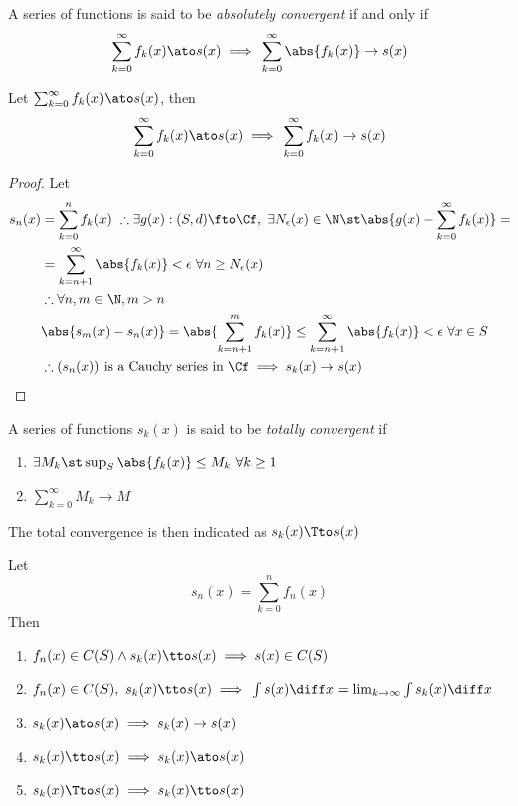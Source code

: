 \documentclass[../mmf.tex]{subfiles}
\begin{document}
\begin{dfn}
	A series of functions is said to be \textit{absolutely convergent} if and only if
	\begin{equation}
		\sum_{k=0}^\infty f_k(x)\ato s(x)\implies{}\sum_{k=0}^\infty\abs{f_k(x)}\to s(x)
		\label{eq:absoluteconvser}
	\end{equation}
\end{dfn}
\begin{thm}
	Let $\sum_{k=0}^\infty f_k(x)\ato s(x)$, then
	\begin{equation}
		\sum_{k=0}^\infty f_k(x)\ato s(x)\implies{}\sum_{k=0}^\infty f_k(x)\to s(x)
		\label{eq:abstounif}
	\end{equation}
\end{thm}
\begin{proof}
	Let
	\begin{equation*}
		\begin{aligned}
			s_n(x)&=\sum_{k=0}^nf_k(x)\ \therefore\exists g(x):(S,d)\fto\Cf,\ \exists N_\epsilon(x)\in\N\st\abs{g(x)-\sum_{k=0}^\infty f_k(x)}=\\
			&=\sum_{k=n+1}^{\infty}\abs{f_k(x)}<\epsilon\ \forall n\ge N_\epsilon(x)\\
			&\therefore\forall n,m\in\N, m>n\\
			&\abs{s_m(x)-s_n(x)}=\abs{\sum_{k=n+1}^mf_k(x)}\le\sum_{k=n+1}^{\infty}\abs{f_k(x)}<\epsilon\ \forall x\in S\\
			&\therefore(s_n(x))\text{ is a Cauchy series in }\Cf\implies{} s_k(x)\to s(x)
		\end{aligned}
	\end{equation*}
\end{proof}
\begin{dfn}
	A series of functions $s_k(x)$ is said to be \textit{totally convergent} if
	\begin{enumerate}
	\item $\exists M_k\st\sup_{S}\abs{f_k(x)}\le M_k\ \forall k\ge 1$
	\item $\sum_{k=0}^\infty M_k\to M$
	\end{enumerate}
	The total convergence is then indicated as $s_k(x)\Tto s(x)$
\end{dfn}
\begin{prop}
	Let
	\begin{equation*}
		s_n(x)=\sum_{k=0}^{n}f_n(x)
	\end{equation*}
	Then
	\begin{enumerate}
	\item $f_n(x)\in C(S)\wedge s_k(x)\tto s(x)\implies{} s(x)\in C(S)$
	\item $f_n(x)\in C(S),\ s_k(x)\tto s(x)\implies{}\int s(x)\diff x=\lim_{k\to\infty}\int s_k(x)\diff x$
	\item $s_k(x)\ato s(x)\implies{} s_k(x)\to s(x)$
	\item $s_k(x)\tto s(x)\implies{} s_k(x)\ato s(x)$
	\item $s_k(x)\Tto s(x)\implies{} s_k(x)\tto s(x)$
	\end{enumerate}
\end{prop}
\end{document}
